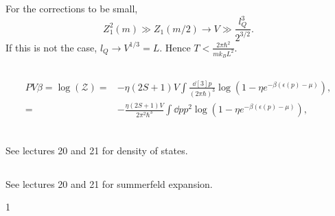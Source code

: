 \documentclass[a4paper,12pt,twoside]{article}
\newcommand{\mcols}{0}
\begin{document}
\begin{multicols*}{2}
\subsubsection{}
For the corrections to be small,
\begin{equation}
	Z_1^2(m) \gg Z_1(m/2) \rightarrow V \gg \frac{l_Q^3}{2^{3/2}}.
\end{equation}
If this is not the case, $l_Q \rightarrow V^{1/3} = L$.
Hence $T < \frac{2\pi \hbar^2}{m k_B L^2}$.

\subsection{}
\begin{align}
	PV\beta = \log(\mathcal{Z}) =& -\eta(2S+1)V\int\frac{\dd[3]{p}}{(2\pi\hbar)^3}\log(1-\eta e^{-\beta(\epsilon(p) - \mu)}),\\
	=& -\frac{\eta(2S+1)V}{2\pi^2\hbar^3} \int \dd{p} p^2 \log(1-\eta e^{-\beta(\epsilon(p)-\mu)}),\\
\end{align}
\subsection{}
See lectures 20 and 21 for density of states.
\subsection{}
See lectures 20 and 21 for summerfeld expansion.

\printBib


\if\mcols1
\end{multicols*}
\fi
\end{document}
